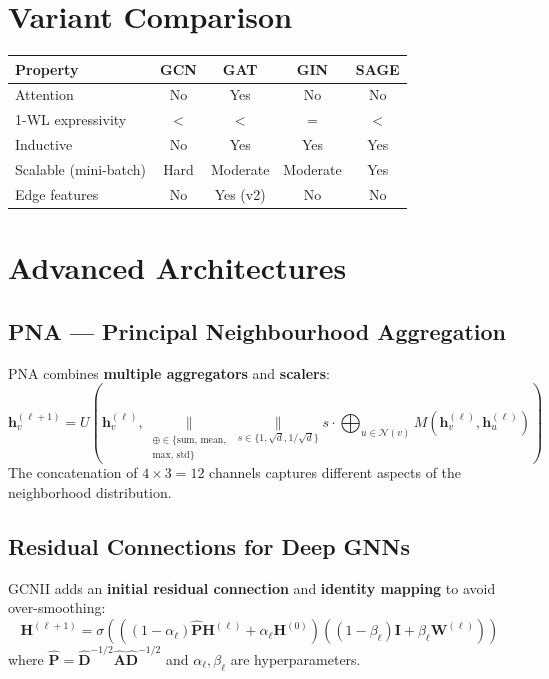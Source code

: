 \section{Variant Comparison}

\begin{center}
\begin{tabular}{lcccc}
\toprule
\textbf{Property} & \textbf{GCN} & \textbf{GAT} & \textbf{GIN} & \textbf{SAGE} \\
\midrule
Attention & No & Yes & No & No \\
1-WL expressivity & $<$ & $<$ & $=$ & $<$ \\
Inductive & No & Yes & Yes & Yes \\
Scalable (mini-batch) & Hard & Moderate & Moderate & Yes \\
Edge features & No & Yes (v2) & No & No \\
\bottomrule
\end{tabular}
\end{center}

\section{Advanced Architectures}

\subsection{PNA --- Principal Neighbourhood Aggregation}

\begin{definition}
PNA combines \textbf{multiple aggregators} and \textbf{scalers}:
\[
    \mathbf{h}_v^{(\ell+1)} = U\!\left(\mathbf{h}_v^{(\ell)},
    \underset{\substack{\oplus \in \{\text{sum, mean,}\\\text{max, std}\}}}
    {\Big\|}
    \underset{s \in \{1, \sqrt{d}, 1/\sqrt{d}\}}{\Big\|}
    s \cdot \bigoplus_{u \in \mathcal{N}(v)} M(\mathbf{h}_v^{(\ell)},
    \mathbf{h}_u^{(\ell)})\right)
\]
The concatenation of $4 \times 3 = 12$ channels captures different aspects
of the neighborhood distribution.
\end{definition}

\subsection{Residual Connections for Deep GNNs}

\begin{definition}
GCNII adds an \textbf{initial residual connection} and \textbf{identity
mapping} to avoid over-smoothing:
\[
    \mathbf{H}^{(\ell+1)} = \sigma\!\left(\left((1-\alpha_\ell)\hat{\mathbf{P}}
    \mathbf{H}^{(\ell)} + \alpha_\ell \mathbf{H}^{(0)}\right)
    \left((1-\beta_\ell)\mathbf{I} + \beta_\ell \mathbf{W}^{(\ell)}\right)\right)
\]
where $\hat{\mathbf{P}} = \hat{\mathbf{D}}^{-1/2}\hat{\mathbf{A}}\hat{\mathbf{D}}^{-1/2}$
and $\alpha_\ell, \beta_\ell$ are hyperparameters.
\end{definition}

